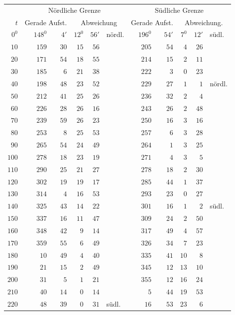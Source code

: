 \begin{center}
\begingroup\fontsize{9.25}{9.65}\selectfont\setlength{\tabcolsep}{4.8pt}
\begin{tabular}{r||rr|rrl||rr|rrl}
&\multicolumn{5}{c||}{Nördliche Grenze}&\multicolumn{5}{c}{Südliche Grenze}\\
$t$&\multicolumn{2}{c|}{Gerade Aufst.}&\multicolumn{3}{c||}{Abweichung}&\multicolumn{2}{c|}{Gerade Aufst.}&\multicolumn{3}{c}{Abweichung.}\\\hline
$0^0$&$148^0$&$4'$&$12^0$&$56'$&nördl.&$196^0$&$54'$&$7^0$&$12'$&südl.\\
$10$&$159$&$30$&$15$&$56$&&$205$&$54$&$4$&$26$&\\
$20$&$171$&$54$&$18$&$55$&&$214$&$15$&$2$&$11$&\\
$30$&$185$&$6$&$21$&$38$&&$222$&$3$&$0$&$23$&\\
$40$&$198$&$48$&$23$&$52$&&$229$&$27$&$1$&$1$&nördl.\\
$50$&$212$&$41$&$25$&$26$&&$236$&$32$&$2$&$4$&\\
$60$&$226$&$28$&$26$&$16$&&$243$&$26$&$2$&$48$&\\[3pt]
$70$&$239$&$59$&$26$&$23$&&$250$&$16$&$3$&$16$&\\
$80$&$253$&$8$&$25$&$53$&&$257$&$6$&$3$&$28$&\\
$90$&$265$&$54$&$24$&$49$&&$264$&$1$&$3$&$25$&\\
$100$&$278$&$18$&$23$&$19$&&$271$&$4$&$3$&$5$&\\
$110$&$290$&$25$&$21$&$27$&&$278$&$18$&$2$&$30$&\\
$120$&$302$&$19$&$19$&$17$&&$285$&$44$&$1$&$37$&\\[3pt]
$130$&$314$&$4$&$16$&$53$&&$293$&$23$&$0$&$27$&\\
$140$&$325$&$43$&$14$&$22$&&$301$&$16$&$1$&$2$&südl.\\
$150$&$337$&$16$&$11$&$47$&&$309$&$24$&$2$&$50$&\\
$160$&$348$&$42$&$9$&$14$&&$317$&$49$&$4$&$57$&\\
$170$&$359$&$55$&$6$&$49$&&$326$&$34$&$7$&$23$&\\
$180$&$10$&$49$&$4$&$40$&&$335$&$41$&$10$&$8$&\\[3pt]
$190$&$21$&$15$&$2$&$49$&&$345$&$12$&$13$&$10$&\\
$200$&$31$&$5$&$1$&$21$&&$355$&$12$&$16$&$24$&\\
$210$&$40$&$14$&$0$&$14$&&$5$&$44$&$19$&$53$&\\
$220$&$48$&$39$&$0$&$31$&südl.&$16$&$53$&$23$&$6$&\\

\end{tabular}
\end{center}
